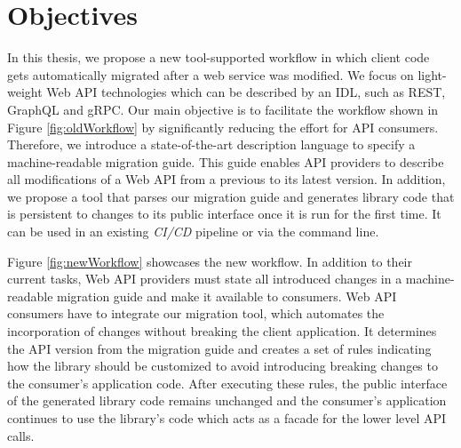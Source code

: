 \section{Objectives}
\label{sec:Objectives}

In this thesis, we propose a new tool-supported workflow in which client code gets automatically migrated after a web service was modified. We focus on light-weight Web API technologies which can be described by an IDL, such as REST, GraphQL and gRPC. Our main objective is to facilitate the workflow shown in Figure \ref{fig:oldWorkflow} by significantly reducing the effort for API consumers. Therefore, we introduce a state-of-the-art description language to specify a machine-readable migration guide. This guide enables API providers to describe all modifications of a Web API from a previous to its latest version. In addition, we propose a tool that parses our migration guide and generates library code that is persistent to changes to its public interface once it is run for the first time. It can be used in an existing \textit{\ac{CI/CD}} pipeline or via the command line.

\begin{figure}[h]
\end{figure}

Figure \ref{fig:newWorkflow} showcases the new workflow. In addition to their current tasks, Web API providers must state all introduced changes in a machine-readable migration guide and make it available to consumers. Web API consumers have to integrate our migration tool, which automates the incorporation of changes without breaking the client application. It determines the API version from the migration guide and creates a set of rules indicating how the library should be customized to avoid introducing breaking changes to the consumer's application code. After executing these rules, the public interface of the generated library code remains unchanged and the consumer's application continues to use the library's code which acts as a facade for the lower level API calls.